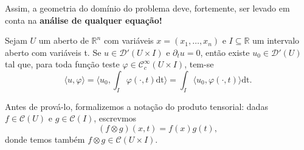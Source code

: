 \documentclass[../distribution_theory_notes.tex]{subfiles}
\begin{document}
Assim, a geometria do domínio do problema deve, fortemente, ser levado em conta na \textbf{análise de qualquer equação!}
\begin{theorem*}
	Sejam \(U\) um aberto de \(\mathbb{R}^{n}\) com variáveis \(x=(x_1,\dotsc , x_{n})\) e \(I\subseteq \mathbb{R}\) um intervalo aberto com variáveis t. Se \(u\in \mathcal{D}'(U\times I)\) e \(\partial_t u=0\), então existe \(u_{0}\in \mathcal{D}'(U)\) tal que, para toda função teste \(\varphi \in \mathcal{C}_{c}^{\infty}(U\times I)\), tem-se
	\[
		\langle u, \varphi  \rangle = \biggl\langle u_{0}, \int_{I}^{}\varphi (\cdot , t) \mathrm{dt} \biggr\rangle = \int_{I}^{}\langle u_{0}, \varphi (\cdot , t) \rangle \mathrm{dt}.
	\]
\end{theorem*}
Antes de prová-lo, formalizemos a notação do produto tensorial: dadas \(f\in \mathcal{C}(U)\) e \(g\in \mathcal{C}(I)\), escrevmos
\[
	(f\otimes g)(x, t)=f(x)g(t),
\]
donde temos também \(f\otimes g\in \mathcal{C}(U\times I)\).
\end{document}
